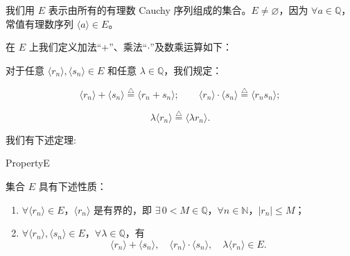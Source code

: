 我们用 $E$ 表示由所有的有理数 Cauchy 序列组成的集合。$E \ne \varnothing$，因为 $\forall a \in \mathbb{Q}$，常值有理数序列 $\langle a \rangle \in E$。

在 $E$ 上我们定义加法“$+$”、乘法“$\cdot$”及数乘运算如下：

对于任意 $\langle r_n \rangle, \langle s_n \rangle \in E$ 和任意 $\lambda \in \mathbb{Q}$，我们规定：

\[
\langle r_n \rangle + \langle s_n \rangle \stackrel{\triangle}{=} \langle r_n + s_n \rangle; \qquad
\langle r_n \rangle \cdot \langle s_n \rangle \stackrel{\triangle}{=} \langle r_n s_n \rangle;
\]

\[
\lambda \langle r_n \rangle \stackrel{\triangle}{=} \langle \lambda r_n \rangle.
\]

我们有下述定理:

\begin{mythm}{}{PropertyE}

集合 \(E\) 具有下述性质：

\begin{enumerate}[label=\arabic*)]
	\item \(\forall \langle r_n \rangle \in E\)，\(\langle r_n \rangle\) 是有界的，即 \(\exists\,0<M\in\mathbb{Q}\)，\(\forall n\in\mathbb{N}\)，\(|r_n|\leq M\)；
	\item \(\forall \langle r_n \rangle, \langle s_n \rangle \in E\)，\(\forall \lambda \in \mathbb{Q}\)，有
	\[
	\langle r_n \rangle + \langle s_n \rangle,\quad
	\langle r_n \rangle \cdot \langle s_n \rangle,\quad
	\lambda \langle r_n \rangle \in E.
	\]
\end{enumerate}

\end{mythm}



